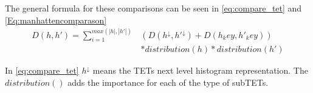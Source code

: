 	The general formula for these comparisons can be seen in \autoref{eq:compare_tet} and \autoref{Eq:manhattencomparason}
	\begin{equation}\label{eq:compare_tet}
	\begin{split}
	D(h,h') = \sum_{i=1}^{max(|h|,|h'|)} & (D(h^{\downarrow}, h'^{\downarrow})+ D(h_key, h'_key))  \\
	& * distribution(h) * distribution (h')
	\end{split}
	\end{equation}
	
	In \autoref{eq:compare_tet} $h^{\downarrow}$ means the TETs next level histogram representation. The $distribution()$ adds the importance for each of the type of subTETs.
